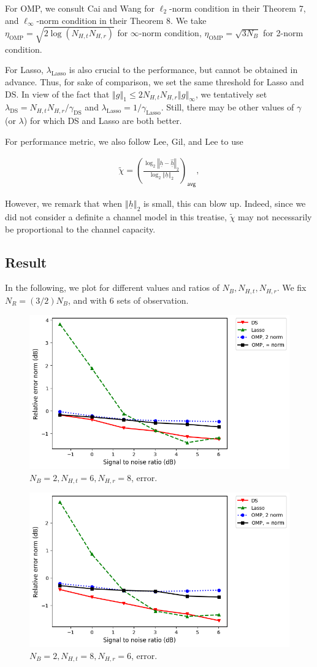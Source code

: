 \documentclass[journal]{IEEEtran}
\newcommand {\g} {\gamma}
\newcommand {\h} {\eta}
\renewcommand {\l} {\lambda}
\newcommand {\m} [1] {\( #1 \)}
\newcommand {\V} [1] {\underline {#1}}
\newcommand {\T} [1] {\tilde {#1}}
\newcommand {\RB} [1] {\left( #1 \right)}
\newcommand {\VNm} [1] {\left \Vert #1 \right \Vert}
\newcommand {\R} [1] {\sqrt {#1}}
\newcommand {\Disp} [1] {
   \begin {align*}
      #1
   \end {align*}
}
\begin{document}
For OMP, we consult Cai and Wang \cite {CaW11} for \m {\ell _2}-norm condition in their Theorem 7, and \m {\ell _\infty}-norm condition in their Theorem 8.
We take \m {\h_{\mathrm {OMP}} = \R {2 \log \RB {N_{H,t} N_{H,r}}}} for \m {\infty}-norm condition, \m {\h_{\mathrm {OMP}} = \R {3 N_B}} for 2-norm condition.

For Lasso, \m {\l _{\mathrm {Lasso}}} is also crucial to the performance, but cannot be obtained in advance.
Thus, for sake of comparison, we set the same threshold for Lasso and DS.
In view of the fact that \m {\VNm {g} _1 \leq 2 N_{H,t} N_{H,r} \VNm {g} _\infty}, we tentatively set \m {\l _{\mathrm {DS}} =  N_{H,t} N_{H,r} / \g _{\mathrm {DS}}} and \m {\l _{\mathrm {Lasso}} =  1 / \g _{\mathrm {Lasso}}}.
Still, there may be other values of \m {\g} (or \m {\l}) for which DS and Lasso are both better.

For performance metric, we also follow Lee, Gil, and Lee \cite {LGL16} to use
\Disp {
\tilde {\chi}
=\RB {
   \frac {\log_2 {\VNm {\V {h} -\hat {\V {h}}} _2}}
   {\log_2 {\VNm {\V {h}}_2}}
} _{\mathsf {avg}}, 
}
However, we remark that when \m {\VNm {\V {h}}_2} is small, this can blow up.
Indeed, since we did not consider a definite a channel model in this treatise, \m {\T {\chi}} may not necessarily be proportional to the channel capacity.

\subsection {Result}

In the following, we plot for different values and ratios of \m {N_B, N_{H,t}, N_{H,r}}.
We fix \m {N_R = \RB {3/2} N_B}, and with \m {6} sets of observation.

\begin {figure} [H]
\includegraphics [width = 0.45 \textwidth]
{error-small-more-tall-six-usual.png}
\caption {\m {N_B = 2, N_{H,t} = 6, N_{H,r} = 8}, error.}
\end {figure}

\begin {figure} [H]
\includegraphics [width = 0.45 \textwidth]
{error-small-more-wide-six-usual.png}
\caption {\m {N_B = 2, N_{H,t} = 8, N_{H,r} = 6}, error.}
\end {figure}
\end{document}
